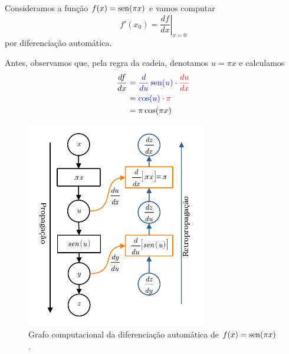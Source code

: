 \begin{ex}\label{ex:mlp_autograd_df1d}
  Consideramos a função $f(x) = \operatorname{sen}(\pi x)$ e vamos computar
  \begin{equation}
    f'(x_0) = \left.\frac{d f}{d x}\right|_{x=0}
  \end{equation}
  por diferenciação automática.

  Antes, observamos que, pela regra da cadeia, denotamos $u = \pi x$ e calculamos
  \begin{align}
    \frac{df}{dx} &= {\color{blue}\frac{d}{du}\operatorname{sen}(u)}\cdot{\color{red}\frac{d u}{dx}}\\
                  &= {\color{blue}\cos(u)}\cdot{\color{red}\pi} \\
                  &= \pi\cos(\pi x)
  \end{align}

  \begin{figure}[H]
    \centering
    \includegraphics[width=0.7\textwidth]{cap_mlp/dados/fig_autograd_f1d/fig}
    \caption{Grafo computacional da diferenciação automática de $f(x) = \operatorname{sen}(\pi x)$.}
    \label{fig:autograd_f1d}
  \end{figure}  


\end{ex}
